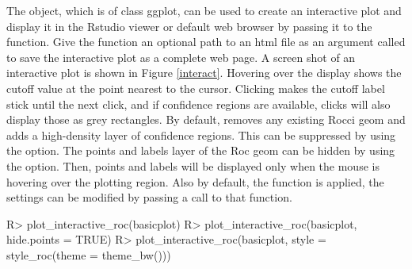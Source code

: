 \documentclass[codesnippet]{jss}
\begin{document}
The  object, which is of class ggplot, can be used to
create an interactive plot and display it in the Rstudio viewer or
default web browser by passing it to the 
function. Give the function an optional path to an html file as an
argument called  to save the interactive plot as a complete
web page. A screen shot of an interactive plot is shown in Figure
\ref{interact}. Hovering over the display shows the cutoff value at the
point nearest to the cursor. Clicking makes the cutoff label stick until
the next click, and if confidence regions are available, clicks will
also display those as grey rectangles. By default,
 removes any existing Rocci geom and adds a
high-density layer of confidence regions. This can be suppressed by
using the  option. The points and labels layer of
the Roc geom can be hidden by using the 
option. Then, points and labels will be displayed only when the mouse is
hovering over the plotting region. Also by default, the 
function is applied, the settings can be modified by passing a call to
that function.

\begin{Schunk}
\begin{Sinput}
R> plot_interactive_roc(basicplot)
R> plot_interactive_roc(basicplot, hide.points = TRUE)
R> plot_interactive_roc(basicplot, style = style_roc(theme = theme_bw()))
\end{Sinput}
\end{Schunk}
\end{document}
